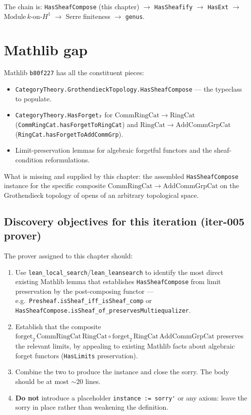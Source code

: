 The chain is: \texttt{HasSheafCompose} (this chapter) $\to$ \texttt{HasSheafify} $\to$ \texttt{HasExt} $\to$ $\mathrm{Module}\, k$-on-$H^1$ $\to$ Serre finiteness $\to$ \lstinline{genus}.

\section{Mathlib gap}

Mathlib \texttt{b80f227} has all the constituent pieces:
\begin{itemize}
  \item \lstinline{CategoryTheory.GrothendieckTopology.HasSheafCompose} — the typeclass to populate.
  \item \lstinline{CategoryTheory.HasForget₂} for $\mathrm{CommRingCat} \to \mathrm{RingCat}$ (\lstinline{CommRingCat.hasForgetToRingCat}) and $\mathrm{RingCat} \to \mathrm{AddCommGrpCat}$ (\lstinline{RingCat.hasForgetToAddCommGrp}).
  \item Limit-preservation lemmas for algebraic forgetful functors and the sheaf-condition reformulations.
\end{itemize}

What is missing and supplied by this chapter: the assembled \texttt{HasSheafCompose} instance for the specific composite $\mathrm{CommRingCat} \to \mathrm{AddCommGrpCat}$ on the Grothendieck topology of opens of an arbitrary topological space.

\subsection{Discovery objectives for this iteration (iter-005 prover)}

The prover assigned to this chapter should:
\begin{enumerate}
  \item Use \lstinline{lean_local_search}/\lstinline{lean_leansearch} to identify the most direct existing Mathlib lemma that establishes \lstinline{HasSheafCompose} from limit preservation by the post-composing functor — e.g.\ \lstinline{Presheaf.isSheaf_iff_isSheaf_comp} or \lstinline{HasSheafCompose.isSheaf_of_preservesMultiequalizer}.
  \item Establish that the composite $\mathrm{forget}_2\, \mathrm{CommRingCat}\, \mathrm{RingCat} \circ \mathrm{forget}_2\, \mathrm{RingCat}\, \mathrm{AddCommGrpCat}$ preserves the relevant limits, by appealing to existing Mathlib facts about algebraic forget functors (\lstinline{HasLimits} preservation).
  \item Combine the two to produce the instance and close the sorry. The body should be at most $\sim 20$ lines.
  \item \textbf{Do not} introduce a placeholder \lstinline{instance := sorry'} or any axiom: leave the sorry in place rather than weakening the definition.
\end{enumerate}
